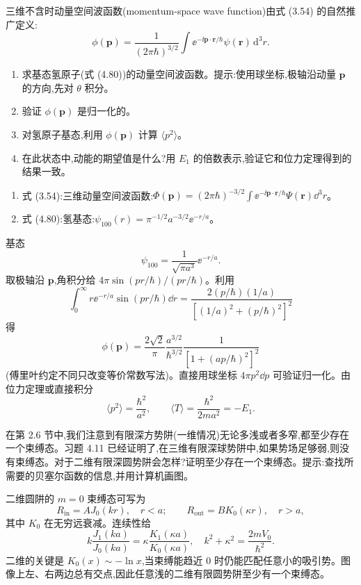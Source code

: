 \begin{question}
三维不含时动量空间波函数(momentum-space wave function)由式 (3.54) 的自然推广定义:
\[
\phi(\mathbf p)=\frac{1}{(2\pi\hbar)^{3/2}}\int \ee^{-\ii\mathbf p\cdot\mathbf r/\hbar}\psi(\mathbf r)\,\mathrm d^3r.
\]
\begin{enumerate}
\item 求基态氢原子(式 (4.80))的动量空间波函数。提示:使用球坐标,极轴沿动量 $\mathbf p$ 的方向,先对 $\theta$ 积分。
\item 验证 $\phi(\mathbf p)$ 是归一化的。
\item 对氢原子基态,利用 $\phi(\mathbf p)$ 计算 $\langle p^2\rangle$。
\item 在此状态中,动能的期望值是什么?用 $E_1$ 的倍数表示,验证它和位力定理得到的结果一致。
\end{enumerate}

\par\smallskip
{}
\begin{enumerate}[leftmargin=2.2em,itemsep=0.12em,topsep=0.12em,parsep=0pt]
\item 式 (3.54):三维动量空间波函数:$\Phi(\mathbf p)=(2\pi\hbar)^{-3/2}\int \ee^{-\ii\mathbf p\cdot\mathbf r/\hbar}\Psi(\mathbf r)\dd^3r$。
\item 式 (4.80):氢基态:$\psi_{100}(r)=\pi^{-1/2}a^{-3/2}\ee^{-r/a}$。
\end{enumerate}

\end{question}
\begin{solution}

基态
\[
\psi_{100}=\frac{1}{\sqrt{\pi a^3}}\ee^{-r/a}.
\]
取极轴沿 $\mathbf p$,角积分给 $4\pi\sin(pr/\hbar)/(pr/\hbar)$。利用
\[
\int_0^\infty r \ee^{-r/a}\sin(pr/\hbar)\dd r=\frac{2(p/\hbar)(1/a)}{[(1/a)^2+(p/\hbar)^2]^2}
\]
得
\[
\phi(\mathbf p)=\frac{2\sqrt2}{\pi}\frac{a^{3/2}}{\hbar^{3/2}}\frac{1}{\left[1+(ap/\hbar)^2\right]^2}
\]
(傅里叶约定不同只改变等价常数写法)。直接用球坐标 $4\pi p^2\dd p$ 可验证归一化。由位力定理或直接积分
\[
\langle p^2\rangle=\frac{\hbar^2}{a^2},
\qquad
\langle T\rangle=\frac{\hbar^2}{2ma^2}=-E_1.
\]

\end{solution}

\begin{question}
在第 2.6 节中,我们注意到有限深方势阱(一维情况)无论多浅或者多窄,都至少存在一个束缚态。习题 4.11 已经证明了,在三维有限深球势阱中,如果势场足够弱,则没有束缚态。对于二维有限深圆势阱会怎样?证明至少存在一个束缚态。提示:查找所需要的贝塞尔函数的信息,并用计算机画图。
\end{question}
\begin{solution}

二维圆阱的 $m=0$ 束缚态可写为
\[
R_{\text{in}}=AJ_0(kr),\quad r<a;
\qquad
R_{\text{out}}=BK_0(\kappa r),\quad r>a,
\]
其中 $K_0$ 在无穷远衰减。连续性给
\[
k\frac{J_1(ka)}{J_0(ka)}=\kappa\frac{K_1(\kappa a)}{K_0(\kappa a)},
\quad k^2+\kappa^2=\frac{2mV_0}{\hbar^2}.
\]
二维的关键是 $K_0(x)\sim-\ln x$,当束缚能趋近 0 时仍能匹配任意小的吸引势。图像上左、右两边总有交点,因此任意浅的二维有限圆势阱至少有一个束缚态。

\end{solution}

